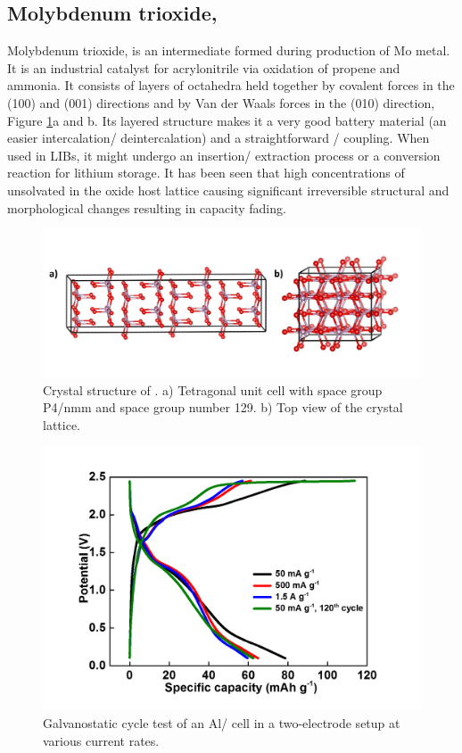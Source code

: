 \subsection*{Molybdenum trioxide, }
Molybdenum trioxide,  is an intermediate formed during production of Mo metal. It is an industrial catalyst for acrylonitrile via oxidation of propene and ammonia. It consists of layers of  octahedra held together by covalent forces in the (100) and (001) directions and by Van der Waals forces in the (010) direction, Figure \ref{Figures/chap6fig:MoO3crys}a and b. Its layered structure makes it a very good battery material (an easier intercalation/ deintercalation) and a straightforward / coupling. When used in LIBs, it might undergo an insertion/ extraction process or a conversion reaction for lithium storage. It has been seen that high concentrations of unsolvated  in the oxide host lattice causing significant irreversible structural and morphological changes resulting in capacity fading. 
 \begin{figure}[tbh!]
  \centering
  \includegraphics[width=\textwidth]{Figures/chap6fig/MoO3crys}
    \caption{Crystal structure of . a) Tetragonal unit cell with space group P4/nmm and space group number 129. b) Top view of the crystal lattice.}
  \label{Figures/chap6fig:MoO3crys}
\end{figure}
 \begin{figure}[tbh!]
  \centering
  \includegraphics[width=\textwidth]{Figures/chap6fig/MoO3CDCredo}
    \caption{Galvanostatic cycle test of an Al/ cell in a two-electrode setup at various current rates.}
  \label{Figures/chap6fig:MoO3CDCredo}
\end{figure}

